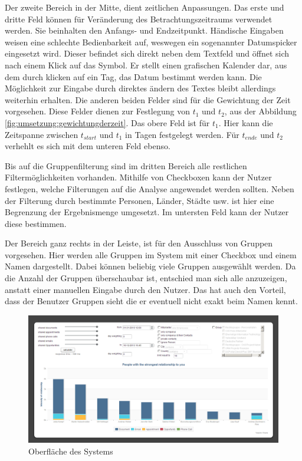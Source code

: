 Der zweite Bereich in der Mitte, dient zeitlichen Anpassungen. Das erste und dritte Feld können für Veränderung des Betrachtungszeitraums verwendet werden. Sie beinhalten den Anfangs- und Endzeitpunkt. Händische Eingaben weisen eine schlechte Bedienbarkeit auf, weswegen ein sogenannter Datumspicker eingesetzt wird. Dieser befindet sich direkt neben dem Textfeld und öffnet sich nach einem Klick auf das Symbol. Er stellt einen grafischen Kalender dar, aus dem durch klicken auf ein Tag, das Datum bestimmt werden kann. Die Möglichkeit zur Eingabe durch direktes ändern des Textes bleibt allerdings weiterhin erhalten. Die anderen beiden Felder sind für die Gewichtung der Zeit vorgesehen. Diese Felder dienen zur Festlegung von $t_1$ und $t_2$, aus der Abbildung \ref{fig:umsetzung:gewichtungderzeit}. Das obere Feld ist für $t_1$. Hier kann die Zeitspanne zwischen $t_{start}$ und $t_1$ in Tagen festgelegt werden. Für $t_{ende}$ und $t_2$ verhehlt es sich mit dem unteren Feld ebenso.

Bis auf die Gruppenfilterung sind im dritten Bereich alle restlichen Filtermöglichkeiten vorhanden. Mithilfe von Checkboxen kann der Nutzer festlegen, welche Filterungen auf die Analyse angewendet werden sollten. Neben der Filterung durch bestimmte Personen, Länder, Städte usw. ist hier eine Begrenzung der Ergebnismenge umgesetzt. Im untersten Feld kann der Nutzer diese bestimmen.

Der Bereich ganz rechts in der Leiste, ist für den Ausschluss von Gruppen vorgesehen. Hier werden alle Gruppen im System mit einer Checkbox und einem Namen dargestellt. Dabei können beliebig viele Gruppen ausgewählt werden. Da die Anzahl der Gruppen überschaubar ist, entschied man sich alle anzuzeigen, anstatt einer manuellen Eingabe durch den Nutzer. Das hat auch den Vorteil, dass der Benutzer Gruppen sieht die er eventuell nicht exakt beim Namen kennt.     

\begin{figure}[htbp]
\centering
\includegraphics[width=\textwidth]{pics/final_screen.png}
\caption{Oberfläche des Systems}
\label{ergebniss_oberflaeche_haupt}
\end{figure}

